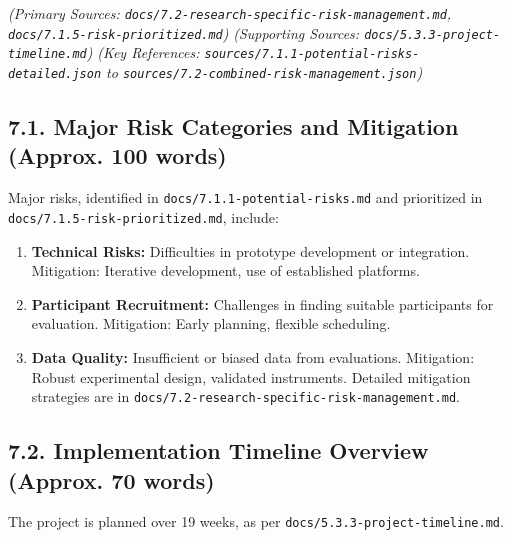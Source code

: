 \documentclass[12pt,a4paper]{article}
\begin{document}
\begin{itemize}
\begin{itemize}
\begin{itemize}
\begin{itemize}
\begin{itemize}
\begin{itemize}
\emph{(Primary Sources: \texttt{docs/7.2-research-specific-risk-management.md}, \texttt{docs/7.1.5-risk-prioritized.md})}
\emph{(Supporting Sources: \texttt{docs/5.3.3-project-timeline.md})}
\emph{(Key References: \texttt{sources/7.1.1-potential-risks-detailed.json} to \texttt{sources/7.2-combined-risk-management.json})}

\subsection{7.1. Major Risk Categories and Mitigation (Approx. 100 words)}
Major risks, identified in \texttt{docs/7.1.1-potential-risks.md} and prioritized in \texttt{docs/7.1.5-risk-prioritized.md}, include:

\begin{enumerate}
\item  \textbf{Technical Risks:} Difficulties in prototype development or integration. Mitigation: Iterative development, use of established platforms.
\item  \textbf{Participant Recruitment:} Challenges in finding suitable participants for evaluation. Mitigation: Early planning, flexible scheduling.
\item  \textbf{Data Quality:} Insufficient or biased data from evaluations. Mitigation: Robust experimental design, validated instruments.
Detailed mitigation strategies are in \texttt{docs/7.2-research-specific-risk-management.md}.
\end{enumerate}

\subsection{7.2. Implementation Timeline Overview (Approx. 70 words)}
The project is planned over 19 weeks, as per \texttt{docs/5.3.3-project-timeline.md}.

\end{itemize}
\end{itemize}
\end{itemize}
\end{itemize}
\end{itemize}
\end{itemize}
\end{document}

